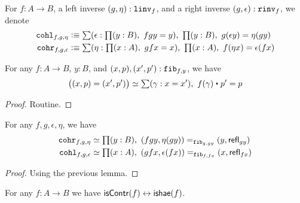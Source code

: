 \begin{defn}
For $f : A \to B$, a left inverse $(g,\eta) : \mathtt{linv}_{f}$, and a right inverse $(g,\epsilon) : \mathtt{rinv}_{f}$, we denote
\begin{align*}
\lcoh{f}{g}{\eta} & \defeq \sm{\epsilon : \prd{y: B} fgy = y} \prd{y:B} g(\epsilon y) = \eta (gy) \\
\rcoh{f}{g}{\epsilon} & \defeq \sm{\eta : \prd{x: A} gfx = x} \prd{x:A} f(\eta x) = \epsilon (fx)
\end{align*}
\end{defn}

\begin{lem}\label{lem:hfib}
For any $f : A \to B$, $y : B$, and $(x,p),(x',p') : \mathtt{fib}_{f,y}$, we have
\[ \big((x,p) = (x',p')\big) \simeq \sm{\gamma : x = x'} f(\gamma) \ct p' = p\]
\end{lem}
\begin{proof}
Routine.
\end{proof}

\begin{lem}\label{lem:coh-hfib}
For any $f,g,\epsilon,\eta$, we have
\begin{align*}
\rcoh{f}{g}{\eta} & \simeq {\prd{y:B} \id[\hfib{g}{gy}]{(fgy,\eta(gy))}{(y,\refl{gy})}} \\
\lcoh{f}{g}{\epsilon} & \simeq {\prd{x:A} \id[\hfib{f}{fx}]{(gfx,\epsilon(fx))}{(x,\refl{fx})}}
\end{align*}
\end{lem}
\begin{proof}
Using the previous lemma.
\end{proof}

\begin{thm}\label{thm:lequiv-contr-hae}
For any $f:A\to B$ we have ${\mathsf{isContr}(f)} \leftrightarrow {\ensuremath{\mathsf{ishae}}(f)}$.
\end{thm}

